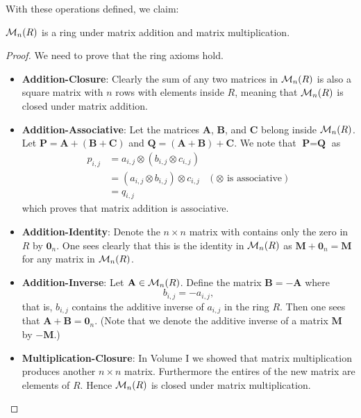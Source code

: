\newpage

With these operations defined, we claim:
\begin{proposition}
    $\mathcal{M}_{n}(R)$ is a ring under matrix addition and matrix multiplication.
\end{proposition}
\begin{proof}
    We need to prove that the ring axioms hold.
    \begin{itemize}
        \item \textbf{Addition-Closure}: Clearly the sum of any two matrices in $\mathcal{M}_{n}(R)$ is also a square matrix with $n$ rows with elements inside $R$, meaning that $\mathcal{M}_{n}(R)$ is closed under matrix addition.

        \item \textbf{Addition-Associative}: Let the matrices $\textbf{A}$, $\textbf{B}$, and $\textbf{C}$ belong inside $\mathcal{M}_{n}(R)$. Let $\textbf{P} = \textbf{A} + (\textbf{B} + \textbf{C})$ and $\textbf{Q} = (\textbf{A} + \textbf{B}) + \textbf{C}$. We note that $\textbf{P} = \textbf{Q}$ as
        \begin{align*}
            p_{i,j} &= a_{i,j} \otimes (b_{i,j} \otimes c_{i,j})\\
            &= (a_{i,j} \otimes b_{i,j}) \otimes c_{i,j} & (\otimes\text{ is associative})\\
            &= q_{i,j}
        \end{align*}
        which proves that matrix addition is associative.

        \item \textbf{Addition-Identity}: Denote the $n \times n$ matrix with contains only the zero in $R$ by $\textbf{0}_n$. One sees clearly that this is the identity in $\mathcal{M}_{n}(R)$ as $\textbf{M} + \textbf{0}_n = \textbf{M}$ for any matrix in $\mathcal{M}_{n}(R)$.
        
        \item \textbf{Addition-Inverse}: Let $\textbf{A} \in \mathcal{M}_{n}(R)$. Define the matrix $\textbf{B} = -\textbf{A}$ where
        \[
            b_{i,j} = -a_{i,j},    
        \]
        that is, $b_{i,j}$ contains the additive inverse of $a_{i,j}$ in the ring $R$. Then one sees that $\textbf{A} + \textbf{B} = \textbf{0}_n$.\newline
        (Note that we denote the additive inverse of a matrix $\textbf{M}$ by $-\textbf{M}$.)

        \item \textbf{Multiplication-Closure}: In Volume I we showed that matrix multiplication produces another $n \times n$ matrix. Furthermore the entires of the new matrix are elements of $R$. Hence $\mathcal{M}_{n}(R)$ is closed under matrix multiplication.
        

\end{itemize}
\end{proof}
